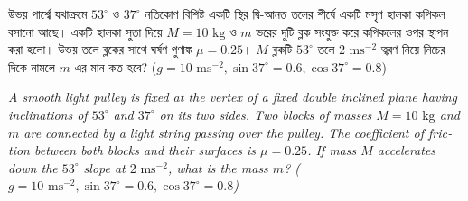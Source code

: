\documentclass[12pt, a4paper]{article}
\begin{document}
\begin{tcolorbox}[questionbox={প্রশ্ন (Question) 47}]
    \noindent
    উভয় পার্শ্বে যথাক্রমে $53^\circ$ ও $37^\circ$ নতিকোণ বিশিষ্ট একটি স্থির দ্বি-আনত তলের শীর্ষে একটি মসৃণ হালকা কপিকল বসানো আছে। একটি হালকা সুতা দিয়ে $M = 10\text{ kg}$ ও $m$ ভরের দুটি ব্লক সংযুক্ত করে কপিকলের ওপর স্থাপন করা হলো। উভয় তলে ব্লকের সাথে ঘর্ষণ গুণাঙ্ক $\mu = 0.25$। $M$ ব্লকটি $53^\circ$ তলে $2\text{ ms}^{-2}$ ত্বরণ নিয়ে নিচের দিকে নামলে $m$-এর মান কত হবে? ($g = 10\text{ ms}^{-2}, \sin 37^\circ = 0.6, \cos 37^\circ = 0.8$)
    
    \vspace{0.8em}
    \begin{english}
    \noindent\textit{\color{darkgray}
    A smooth light pulley is fixed at the vertex of a fixed double inclined plane having inclinations of $53^\circ$ and $37^\circ$ on its two sides. Two blocks of masses $M = 10\text{ kg}$ and $m$ are connected by a light string passing over the pulley. The coefficient of friction between both blocks and their surfaces is $\mu = 0.25$. If mass $M$ accelerates down the $53^\circ$ slope at $2\text{ ms}^{-2}$, what is the mass $m$? ($g = 10\text{ ms}^{-2}, \sin 37^\circ = 0.6, \cos 37^\circ = 0.8$)
    }
    \end{english}
\end{tcolorbox}

\vspace{1em}
\begin{center}
\end{center}
\vspace{1em}
\end{document}
